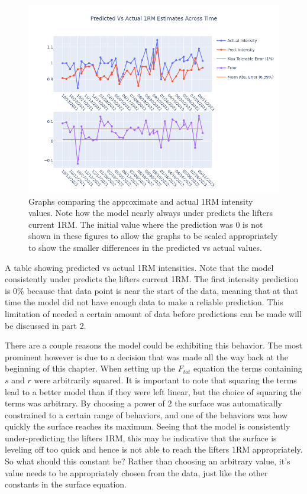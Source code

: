 \begin{figure}[htb]
    \centering
    \includegraphics[scale=0.55]{images/ch3/PredVsActual1RM.basic.png}
    \caption{Graphs comparing the approximate and actual 1RM intensity values. Note how the model nearly always under predicts the lifters current 1RM. The initial value where the prediction was $0$ is not shown in these figures to allow the graphs to be scaled appropriately to show the smaller differences in the predicted vs actual values.}
    \label{fig:ApproximateVsActual1RMIntensity}
\end{figure}
\begin{table}[p]
    \centering
	\caption{A table showing predicted vs actual 1RM intensities. Note that the model consistently under predicts the lifters current 1RM. The first intensity prediction is $0\%$ because that data point is near the start of the data, meaning that at that time the model did not have enough data to make a reliable prediction. This limitation of needed a certain amount of data before predictions can be made will be discussed in part 2.}
	\label{tab:BasicSurface1RMEstimations}
\end{table}

There are a couple reasons the model could be exhibiting this behavior. The most prominent however is due to a decision that was made all the way back at the beginning of this chapter. When setting up the $F_{tot}$ equation the terms containing $s$ and $r$ were arbitrarily squared. It is important to note that squaring the terms lead to a better model than if they were left linear, but the choice of squaring the terms was arbitrary. By choosing a power of $2$ the surface was automatically constrained to a certain range of behaviors, and one of the behaviors was how quickly the surface reaches its maximum. Seeing that the model is consistently under-predicting the lifters 1RM, this may be indicative that the surface is leveling off too quick and hence is not able to reach the lifters 1RM appropriately. So what should this constant be? Rather than choosing an arbitrary value, it's value needs to be appropriately chosen from the data, just like the other constants in the surface equation.

